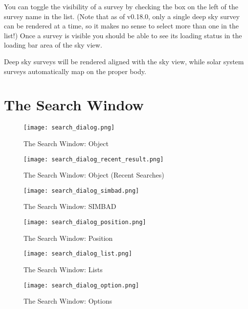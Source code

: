 You can toggle the visibility of a survey by checking the box on the left
of the survey name in the list.  (Note that as of v0.18.0, only a single deep
sky survey can be rendered at a time, so it makes no sense to select more than one in
the list!) Once a survey is visible you should be able to see its loading
status in the loading bar area of the sky view.

Deep sky surveys will be rendered aligned with the sky view, while solar system
surveys automatically map on the proper body.


\section{The Search Window}
\label{sec:gui:search}

\begin{figure}[p]
\centering\texttt{[image: search\_dialog.png]}
\caption{The Search Window: Object}
\label{fig:gui:search}
\end{figure}

\begin{figure}[p]
\centering\texttt{[image: search\_dialog\_recent\_result.png]}
\caption{The Search Window: Object (Recent Searches)}
\label{fig:gui:search:recentSearches}
\end{figure}

\begin{figure}[p]
\centering\texttt{[image: search\_dialog\_simbad.png]}
\caption{The Search Window: SIMBAD}
\label{fig:gui:search:simbad}
\end{figure}

\begin{figure}[p]
\centering\texttt{[image: search\_dialog\_position.png]}
\caption{The Search Window: Position}
\label{fig:gui:search:position}
\end{figure}

\begin{figure}[tbp]
\centering\texttt{[image: search\_dialog\_list.png]}
\caption{The Search Window: Lists}
\label{fig:gui:search:lists}
\end{figure}


\begin{figure}[tbp]
\centering\texttt{[image: search\_dialog\_option.png]}
\caption{The Search Window: Options}
\label{fig:gui:search:options}
\end{figure}

